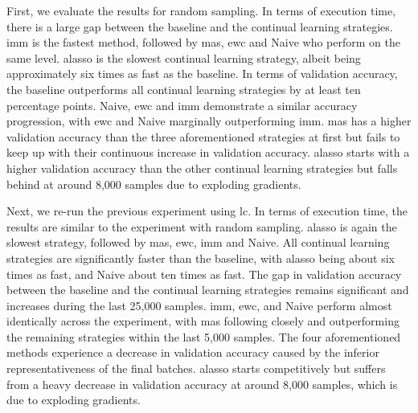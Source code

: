 First, we evaluate the results for random sampling. In terms of execution time, there is a large gap between the baseline and the continual learning strategies.
\gls{imm} is the fastest method, followed by \gls{mas}, \gls{ewc} and Naive who perform on the same level. \gls{alasso} is the slowest continual learning strategy,
albeit being approximately six times as fast as the baseline. In terms of validation accuracy, the baseline outperforms all continual learning strategies by at
least ten percentage points. Naive, \gls{ewc} and \gls{imm} demonstrate a similar accuracy progression, with \gls{ewc} and Naive marginally outperforming \gls{imm}.
\gls{mas} has a higher validation accuracy than the three aforementioned strategies at first but fails to keep up with their continuous increase in validation accuracy.
\gls{alasso} starts with a higher validation accuracy than the other continual learning strategies but falls behind at around 8,000 samples due to exploding
gradients. \par
 

Next, we re-run the previous experiment using \gls{lc}. In terms of execution time, the results are similar to the experiment with random sampling. \gls{alasso} is again
the slowest strategy, followed by \gls{mas}, \gls{ewc}, \gls{imm} and Naive. All continual learning strategies are significantly faster than the baseline, with \gls{alasso}
being about six times as fast, and Naive about ten times as fast. The gap in validation accuracy between the baseline and the continual learning strategies remains significant
and increases during the last 25,000 samples. \gls{imm}, \gls{ewc}, and Naive perform almost identically across the experiment, with \gls{mas} following closely and outperforming
the remaining strategies within the last 5,000 samples. The four aforementioned methods experience a decrease in validation accuracy caused by the inferior representativeness
of the final batches. \gls{alasso} starts competitively but suffers from a heavy decrease in validation accuracy at around 8,000 samples, which is due to exploding gradients. \par


